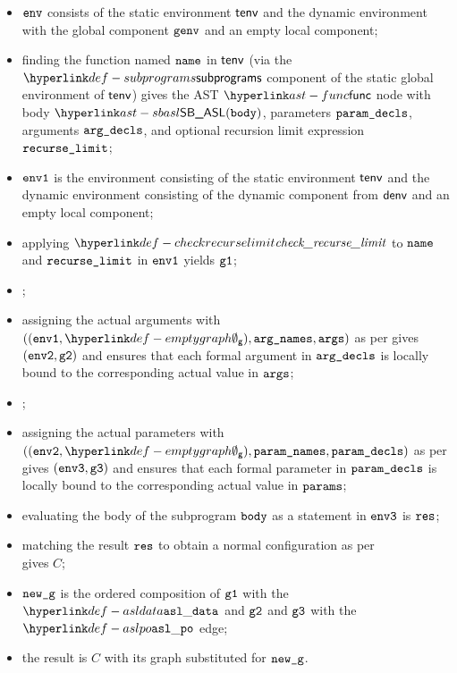 \ProseParagraph
\AllApply
\begin{itemize}
  \item $\texttt{env}$ consists of the static environment $\textsf{tenv}$ and the dynamic environment with the global
        component $\texttt{genv}$ and an empty local component;
  \item finding the function named $\texttt{name}$ in $\textsf{tenv}$ (via the $\subprograms$ component of the static global environment of $\textsf{tenv}$)
        gives the AST $\func$ node with body
        $\SBASL(\vbody)$, parameters $\texttt{param\_decls}$, arguments $\texttt{arg\_decls}$, and optional recursion limit expression $\texttt{recurse\_limit}$;
  \item $\texttt{env1}$ is the environment consisting of the static environment $\textsf{tenv}$ and the dynamic
        environment consisting of the dynamic component from $\textsf{denv}$ and an empty local component;
  \item applying $\checkrecurselimit$ to $\texttt{name}$ and $\texttt{recurse\_limit}$ in $\texttt{env1}$ yields $\texttt{g1}$\ProseOrError;
  \item {};
  \item assigning the actual arguments with $((\envone, \emptygraph), \argnames, \args)$
        as per  gives $(\texttt{env2}, \texttt{g2})$ and ensures that each
        formal argument in $\texttt{arg\_decls}$ is
        locally bound to the corresponding actual value in $\texttt{args}$;
  \item {};
  \item assigning the actual parameters with $((\envtwo, \emptygraph), \paramnames, \paramdecls)$
        as per  gives $(\texttt{env3}, \texttt{g3})$ and ensures that each
        formal parameter in $\texttt{param\_decls}$ is
        locally bound to the corresponding actual value in $\texttt{params}$;
  \item evaluating the body of the subprogram $\texttt{body}$ as a statement in $\texttt{env3}$
        is $\texttt{res}$\ProseOrAbnormal;
  \item matching the result $\texttt{res}$ to obtain a normal configuration as per \\
         gives $C$;
  \item $\texttt{new\_g}$ is the ordered composition of $\texttt{g1}$ with the $\asldata$ and $\texttt{g2}$ and $\texttt{g3}$ with the $\aslpo$ edge;
  \item the result is $C$ with its graph substituted for $\texttt{new\_g}$.
\end{itemize}

